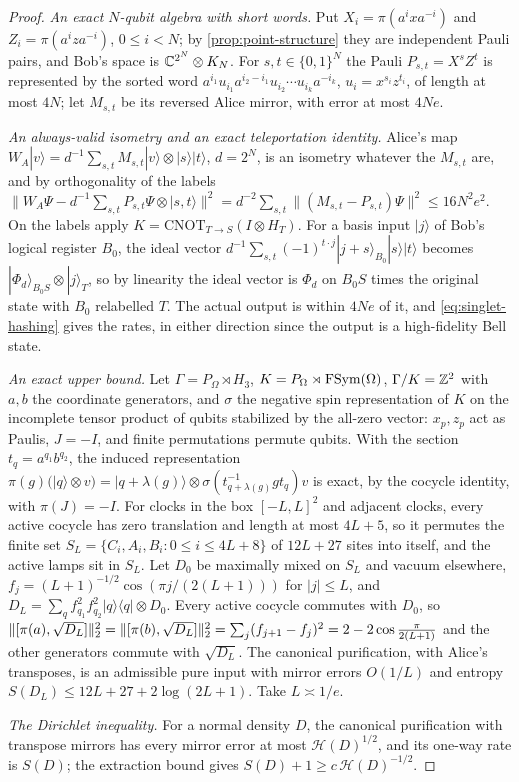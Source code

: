 \begin{proof}
\emph{An exact $N$-qubit algebra with short words.} Put $X_i=\pi(a^ixa^{-i})$ and $Z_i=\pi(a^iza^{-i})$, $0\le i<N$; by
\cref{prop:point-structure} they are independent Pauli pairs, and Bob's space is $\mathbb C^{2^N}\otimes K_N$. For $s,t\in\{0,1\}^N$ the
Pauli $P_{s,t}=X^sZ^t$ is represented by the sorted word $a^{i_1}u_{i_1}a^{i_2-i_1}u_{i_2}\cdots u_{i_k}a^{-i_k}$, $u_i=x^{s_i}z^{t_i}$,
of length at most $4N$; let $M_{s,t}$ be its reversed Alice mirror, with error at most $4Ne$.

\emph{An always-valid isometry and an exact teleportation identity.} Alice's map $W_A|v\rangle=d^{-1}\sum_{s,t}M_{s,t}|v\rangle\otimes|s\rangle|t\rangle$,
$d=2^N$, is an isometry whatever the $M_{s,t}$ are, and by orthogonality of the labels
$\|W_A\Psi-d^{-1}\sum_{s,t}P_{s,t}\Psi\otimes|s,t\rangle\|^2=d^{-2}\sum_{s,t}\|(M_{s,t}-P_{s,t})\Psi\|^2\le16N^2e^2$. On the labels apply
$K=\mathrm{CNOT}_{T\to S}(I\otimes H_T)$. For a basis input $|j\rangle$ of Bob's logical register $B_0$, the ideal vector
$d^{-1}\sum_{s,t}(-1)^{t\cdot j}|j+s\rangle_{B_0}|s\rangle|t\rangle$ becomes $|\Phi_d\rangle_{B_0S}\otimes|j\rangle_T$, so by linearity the ideal
vector is $\Phi_d$ on $B_0S$ times the original state with $B_0$ relabelled $T$. The actual output is within $4Ne$ of it, and
\eqref{eq:singlet-hashing} gives the rates, in either direction since the output is a high-fidelity Bell state.

\emph{An exact upper bound.} Let $\Gamma=P_\Omega\rtimes H_3$, $K=P_\Omega\rtimes\operatorname{FSym}(\Omega)$, $\Gamma/K=\mathbb Z^2$ with $a,b$ the coordinate
generators, and $\sigma$ the negative spin representation of $K$ on the incomplete tensor product of qubits stabilized by the
all-zero vector: $x_p,z_p$ act as Paulis, $J=-I$, and finite permutations permute qubits. With the section $t_q=a^{q_1}b^{q_2}$,
the induced representation $\pi(g)(|q\rangle\otimes v)=|q+\lambda(g)\rangle\otimes\sigma(t^{-1}_{q+\lambda(g)}gt_q)v$ is exact, by the cocycle
identity, with $\pi(J)=-I$. For clocks in the box $[-L,L]^2$ and adjacent clocks, every active cocycle has zero translation and
length at most $4L+5$, so it permutes the finite set $S_L=\{C_i,A_i,B_i:0\le i\le4L+8\}$ of $12L+27$ sites into itself, and the
active lamps sit in $S_L$. Let $D_0$ be maximally mixed on $S_L$ and vacuum elsewhere, $f_j=(L+1)^{-1/2}\cos(\pi j/(2(L+1)))$ for
$|j|\le L$, and $D_L=\sum_qf_{q_1}^2f_{q_2}^2|q\rangle\langle q|\otimes D_0$. Every active cocycle commutes with $D_0$, so
$\lVert [\pi(a),\sqrt{D_L}]\rVert_2^2=\lVert [\pi(b),\sqrt{D_L}]\rVert_2^2=\sum_j(f_{j+1}-f_j)^2=2-2\cos\frac\pi{2(L+1)}$ and the other generators commute
with $\sqrt{D_L}$. The canonical purification, with Alice's transposes, is an admissible pure input with mirror errors
$O(1/L)$ and entropy $S(D_L)\le12L+27+2\log(2L+1)$. Take $L\asymp1/e$.

\emph{The Dirichlet inequality.} For a normal density $D$, the canonical purification with transpose mirrors has every mirror
error at most $\mathcal H(D)^{1/2}$, and its one-way rate is $S(D)$; the extraction bound gives $S(D)+1\ge c\,\mathcal H(D)^{-1/2}$.
\end{proof}

